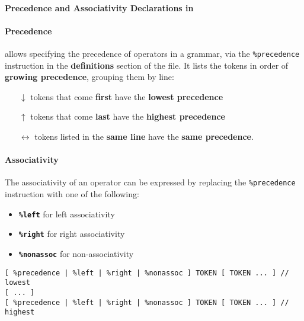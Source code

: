 \paragraph{Precedence and Associativity Declarations in \bison}

\paragraph*{Precedence}
\bison allows specifying the precedence of operators in a grammar, via the \texttt{\%precedence} instruction in the \textbf{definitions} section of the file.
It lists the tokens in order of \textbf{growing precedence}, grouping them by line:

\begin{itemize}
  \item[\(\downarrow\)] tokens that come \textbf{first} have the \textbf{lowest precedence}
  \item[\(\uparrow\)] tokens that come \textbf{last} have the \textbf{highest precedence}
  \item[\(\leftrightarrow\)] tokens listed in the \textbf{same line} have the \textbf{same precedence}.
\end{itemize}

\paragraph*{Associativity}
The associativity of an operator can be expressed by replacing the \texttt{\%precedence} instruction with one of the following:

\begin{itemize}[label=\textbf{\texttt{>}}]
  \item \textbf{\texttt{\%left}} for left associativity
  \item \textbf{\texttt{\%right}} for right associativity
  \item \textbf{\texttt{\%nonassoc}} for non-associativity
\end{itemize}

\begin{onepage}
  \begin{lstlisting}[language=LANCE, caption={Precedence and Associativity declaration}, label={lst:bison-precedence-associativity-declaration}]
[ %precedence | %left | %right | %nonassoc ] TOKEN [ TOKEN ... ] // lowest
[ ... ]
[ %precedence | %left | %right | %nonassoc ] TOKEN [ TOKEN ... ] // highest
\end{lstlisting}
\end{onepage}

